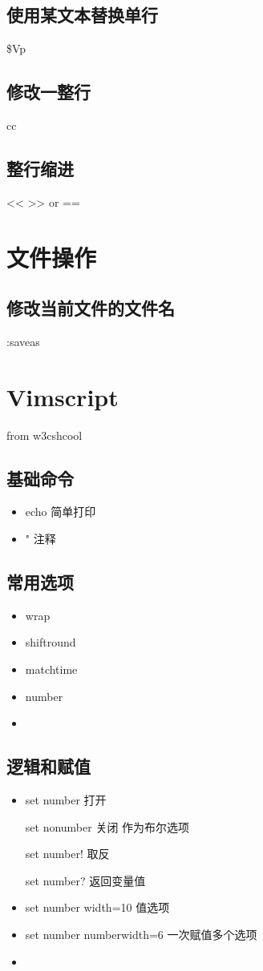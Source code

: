 \documentclass[utf8]{ctexart}
\begin{document}
		\subsection{使用某文本替换单行}
		\par \Large \$Vp
		\subsection{修改一整行}
		\Large 	cc
		\subsection{整行缩进}
		\Large << >> or  ==
		
		
		\section{文件操作}
		\subsection{修改当前文件的文件名}
        \Large 			:saveas
		
		\section{Vimscript}
		from w3cshcool

		\subsection{基础命令}
		\begin{itemize}
				\item echo 简单打印
				\item  " 注释
		\end{itemize}
		\subsection{常用选项}
		\begin{itemize}
				\item wrap
				\item shiftround
				\item matchtime
				\item number
				\item 				
		\end{itemize}
		

		\subsection{逻辑和赋值}

		\begin{itemize}
				\item set number 打开
			\par set nonumber 关闭 作为布尔选项
			\par set number!    取反	
			\par set number? 返回变量值
				\item set number width=10 值选项
				\item set number numberwidth=6 一次赋值多个选项	
				\item 
				

		\end{itemize}
				
		
		
		
		
			
		
		
		
		
\end{document}

